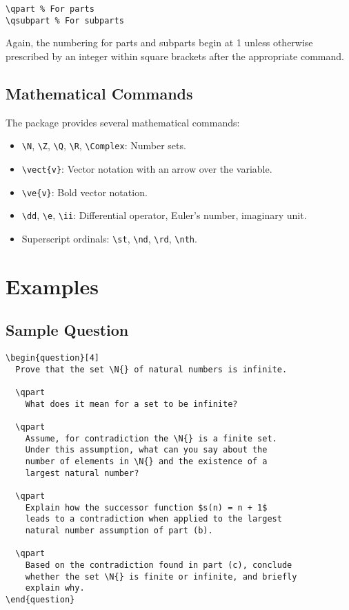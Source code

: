 \documentclass[a4paper,11pt,twoside]{article}
\begin{document}
\begin{verbatim}
\qpart % For parts
\qsubpart % For subparts
\end{verbatim}

Again, the numbering for parts and subparts begin at 1 unless otherwise prescribed by an integer within square brackets after the appropriate command.

\subsection{Mathematical Commands}

The package provides several mathematical commands:

\begin{itemize}
\item \verb|\N|, \verb|\Z|, \verb|\Q|, \verb|\R|, \verb|\Complex|: Number sets.
\item \verb|\vect{v}|: Vector notation with an arrow over the variable.
\item \verb|\ve{v}|: Bold vector notation.
\item \verb|\dd|, \verb|\e|, \verb|\ii|: Differential operator, Euler's number, imaginary unit.
\item Superscript ordinals: \verb|\st|, \verb|\nd|, \verb|\rd|, \verb|\nth|.
\end{itemize}

\section{Examples}

\subsection{Sample Question}

\begin{verbatim}
\begin{question}[4]
  Prove that the set \N{} of natural numbers is infinite.

  \qpart
    What does it mean for a set to be infinite?

  \qpart
    Assume, for contradiction the \N{} is a finite set.
    Under this assumption, what can you say about the
    number of elements in \N{} and the existence of a
    largest natural number?

  \qpart
    Explain how the successor function $s(n) = n + 1$
    leads to a contradiction when applied to the largest
    natural number assumption of part (b).

  \qpart
    Based on the contradiction found in part (c), conclude
    whether the set \N{} is finite or infinite, and briefly
    explain why.
\end{question}
\end{verbatim}
\end{document}
